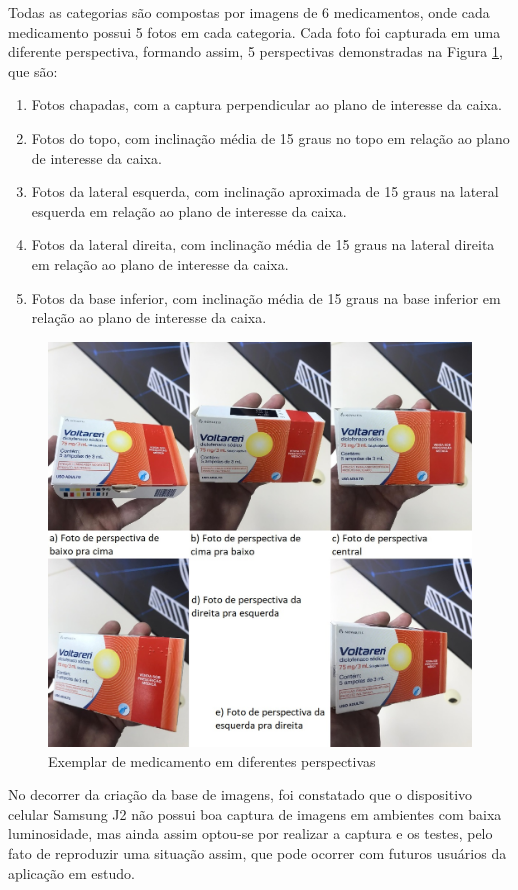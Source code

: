 Todas as categorias são compostas por imagens de 6 medicamentos, onde cada medicamento possui 5 fotos em cada categoria. Cada foto foi capturada em uma diferente perspectiva, formando assim, 5 perspectivas demonstradas na Figura \ref{perspectiva}, que são:
   \begin{enumerate}
   \item Fotos chapadas, com a captura perpendicular ao plano de interesse da caixa.
   \item Fotos do topo, com inclinação média de 15 graus no topo em relação ao plano de interesse da caixa.
    \item Fotos da lateral esquerda, com inclinação aproximada de 15 graus na lateral esquerda em relação ao plano de interesse da caixa.
    \item Fotos da lateral direita, com inclinação média de 15 graus na lateral direita em relação ao plano de interesse da caixa.
    \item Fotos da base inferior, com inclinação média de 15 graus na base inferior em relação ao plano de interesse da caixa.
 \end{enumerate}
  \begin{figure}[h!]
	\centering
	\includegraphics[height=0.70\textwidth]{Imagens/perspectiva.jpg} 
	\caption[Exemplar de medicamento em diferentes perspectivas.]{Exemplar de medicamento em diferentes perspectivas}
	\label{perspectiva}
\end{figure}
 
 
 No decorrer da criação da base de imagens, foi constatado que o dispositivo celular Samsung J2 
 não possui boa captura de imagens em ambientes com baixa luminosidade, mas ainda assim optou-se por realizar a captura e os testes, pelo fato de reproduzir uma situação assim, que pode ocorrer com futuros usuários da aplicação em estudo.


